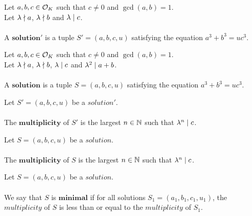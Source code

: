 \begin{definition}[Solution']
    \label{def:Solution1}
    \leanok
    Let $a, b, c \in \mathcal{O}_K$ such that $c \neq 0$ and $\gcd(a,b)=1$.\\
    Let $\lambda \nmid a$, $\lambda \nmid b$ and $\lambda \mid c$. \\\\
    A $\boldsymbol{solution'}$ is a tuple $S'=(a, b, c, u)$
    satisfying the equation $a^3 + b^3 = u c^3.$
\end{definition}

\begin{definition}[Solution]
    \label{def:Solution}
    \leanok
    Let $a, b, c \in \mathcal{O}_K$ such that $c \neq 0$ and $\gcd(a,b)=1$.\\
    Let $\lambda \nmid a$, $\lambda \nmid b$, $\lambda \mid c$ and
    $\lambda^2 \mid a+b$. \\\\
    A $\boldsymbol{solution}$ is a tuple $S=(a, b, c, u)$
    satisfying the equation $a^3 + b^3 = u c^3$.
\end{definition}

\begin{definition}
    \label{def:Solution1_Multiplicity}
    \leanok
    Let $S'=(a, b, c, u)$ be a $solution'$. \\\\
    The $\boldsymbol{multiplicity}$ of $S'$ is the largest $n \in \mathbb{N}$ such that
    $\lambda^n \mid c$.
\end{definition}

\begin{definition}
    \label{def:Solution_Multiplicity}
    \leanok
    Let $S=(a, b, c, u)$ be a $solution$. \\\\
    The $\boldsymbol{multiplicity}$ of $S$ is the largest $n \in \mathbb{N}$ such that
    $\lambda^n \mid c$.
\end{definition}

\begin{definition}
    \label{def:Solution_Minimal}
    \leanok
    Let $S=(a, b, c, u)$ be a $solution$. \\\\
    We say that $S$ is $\boldsymbol{minimal}$ if for all solutions $S_1=(a_1,b_1,c_1,u_1)$,
    the $multiplicity$ of $S$ is less than or equal to the $multiplicity$ of $S_1$.
\end{definition}

